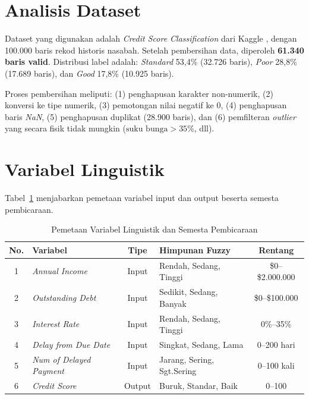 \documentclass[12pt,a4paper]{report}
\begin{document}
\section{Analisis Dataset}

Dataset yang digunakan adalah \textit{Credit Score Classification}
dari Kaggle \cite{kaggle_dataset}, dengan 100.000 baris rekod
historis nasabah. Setelah pembersihan data, diperoleh
\textbf{61.340 baris valid}. Distribusi label adalah:
\textit{Standard} 53,4\% (32.726 baris), \textit{Poor} 28,8\%
(17.689 baris), dan \textit{Good} 17,8\% (10.925 baris).

Proses pembersihan meliputi: (1) penghapusan karakter
non-numerik, (2) konversi ke tipe numerik, (3) pemotongan nilai
negatif ke 0, (4) penghapusan baris \textit{NaN}, (5) penghapusan
duplikat (28.900 baris), dan (6) pemfilteran \textit{outlier}
yang secara fisik tidak mungkin ($\text{suku bunga} > 35\%$, dll).

\section{Variabel Linguistik}

Tabel~\ref{tab:var_linguistik} menjabarkan pemetaan variabel
input dan output beserta semesta pembicaraan.

\begin{table}[H]
  \centering
  \caption{Pemetaan Variabel Linguistik dan Semesta Pembicaraan}
  \label{tab:var_linguistik}
  \renewcommand{\arraystretch}{1.3}
  \small
  \begin{tabular}{|c|l|c|l|c|}
    \hline
    \textbf{No.} & \textbf{Variabel} & \textbf{Tipe} &
    \textbf{Himpunan Fuzzy} & \textbf{Rentang} \\
    \hline
    1 & \textit{Annual Income}           & Input  & Rendah, Sedang, Tinggi      & \$0–\$2.000.000 \\
    2 & \textit{Outstanding Debt}        & Input  & Sedikit, Sedang, Banyak     & \$0–\$100.000   \\
    3 & \textit{Interest Rate}           & Input  & Rendah, Sedang, Tinggi      & 0\%–35\%        \\
    4 & \textit{Delay from Due Date}     & Input  & Singkat, Sedang, Lama       & 0–200 hari      \\
    5 & \textit{Num of Delayed Payment}  & Input  & Jarang, Sering, Sgt.Sering  & 0–100 kali      \\
    6 & \textit{Credit Score}            & Output & Buruk, Standar, Baik        & 0–100           \\
    \hline
  \end{tabular}
\end{table}
\end{document}
